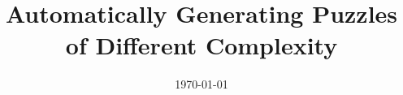\documentclass[12pt]{article}
\begin{document}
\title{Automatically Generating Puzzles of Different Complexity}
\author{}
\date{\today}

\maketitle








\end{document}
